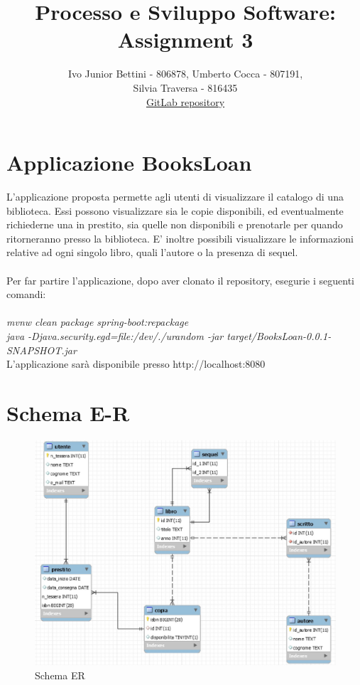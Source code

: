 \documentclass[a4paper,10pt]{article}
\title{Processo e Sviluppo Software: Assignment 3}
\author{Ivo Junior Bettini - 806878, Umberto Cocca - 807191, \\Silvia Traversa - 816435\\
\href{https://gitlab.com/s.traversa/2019_assignment3_booksloan}{GitLab repository}}
\date{}
\begin{document}
\maketitle 


\section*{Applicazione BooksLoan}
L'applicazione proposta permette agli utenti di visualizzare il catalogo di una biblioteca. Essi possono visualizzare sia le copie disponibili, ed eventualmente richiederne una in prestito, sia quelle non disponibili e prenotarle per quando ritorneranno presso la biblioteca.
E' inoltre possibili visualizzare le informazioni relative ad ogni singolo libro, quali l'autore o la presenza di sequel. \\ \\

Per far partire l'applicazione, dopo aver clonato il repository, esegurie i seguenti comandi:\\\\
\textit{mvnw clean package spring-boot:repackage}\\
\textit{java -Djava.security.egd=file:/dev/./urandom -jar target/BooksLoan-0.0.1-SNAPSHOT.jar}\\

L'applicazione sarà disponibile presso http://localhost:8080

\section*{Schema E-R}

\begin{figure}[H]
	\centering
	\includegraphics[width=0.7\linewidth]{images/ERdiagram}
	\caption[Schema ER]{Schema ER}
	\label{fig:re}
\end{figure}
\end{document}
